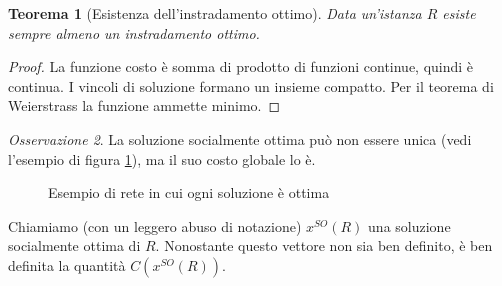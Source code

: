 \documentclass[a4paper]{article}
\theoremstyle{plain}
\newtheorem{myteo}{Teorema}[section]
\theoremstyle{definition}
\theoremstyle{remark}
\newtheorem{myoss}[myteo]{Osservazione}
\newcommand{\pa}[1]{\left(#1\right)}
\begin{document}
\begin{myteo}[Esistenza dell'instradamento ottimo]
  Data un'istanza $R$ esiste sempre almeno un instradamento ottimo.
\end{myteo}
\begin{proof}
  La funzione costo \`e somma di prodotto di funzioni continue, quindi
  \`e continua. I vincoli di soluzione formano un insieme
  compatto. Per il teorema di Weierstrass la funzione ammette minimo.
\end{proof}
\begin{myoss}
  La soluzione socialmente ottima pu\`o non essere unica (vedi
  l'esempio di figura \ref{fig:esempio-so-nonunica}), ma il suo costo
  globale lo \`e.
\end{myoss}
\begin{figure}[ht]
  \centering
  \caption{Esempio di rete in cui ogni soluzione \`e ottima}
  \label{fig:esempio-so-nonunica}
\end{figure}

Chiamiamo (con un leggero abuso di notazione) $x^{SO}\pa{R}$ una
soluzione socialmente ottima di $R$. Nonostante questo vettore non sia
ben definito, \`e ben definita la quantit\`a $C\pa{x^{SO}\pa{R}}$.
\end{document}
